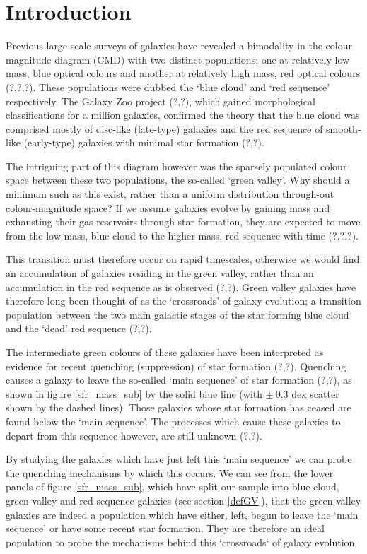 \documentclass{mn2e}
\begin{document}
\section{Introduction}
Previous large scale surveys of galaxies have revealed a bimodality in the colour-magnitude diagram (CMD) with two distinct populations; one at relatively low mass, blue optical colours and another at relatively high mass, red optical colours (?,?,?). These populations were dubbed the `blue cloud' and `red sequence' respectively. The Galaxy Zoo project (?,?), which gained morphological classifications for a million galaxies, confirmed the theory that the blue cloud was comprised mostly of disc-like (late-type) galaxies and the red sequence of smooth-like (early-type) galaxies with minimal star formation (?,?). 

The intriguing part of this diagram however was the sparsely populated colour space between these two populations, the so-called `green valley'. Why should a minimum such as this exist, rather than a uniform distribution through-out colour-magnitude space? If we assume galaxies evolve by gaining mass and exhausting their gas reservoirs through star formation, they are expected to move from the low mass, blue cloud to the higher mass, red sequence with time (?,?,?). 

This transition must therefore occur on rapid timescales, otherwise we would find an accumulation of galaxies residing in the green valley, rather than an accumulation in the red sequence as is observed (?,?). Green valley galaxies have therefore long been thought of as the `crossroads' of galaxy evolution; a transition population between the two main galactic stages of the star forming blue cloud and the `dead' red sequence (?,?).

The intermediate green colours of these galaxies have been interpreted as evidence for recent quenching (suppression) of star formation (?,?). Quenching causes a galaxy to leave the so-called `main sequence' of star formation (?,?), as shown in figure \ref{sfr_mass_sub} by the solid blue line (with $\pm ~0.3$ dex scatter shown by the dashed lines). Those galaxies whose star formation has ceased are found below the `main sequence'. The processes which cause these galaxies to depart from this sequence however, are still unknown (?,?).

By studying the galaxies which  have just left this `main sequence' we can probe the quenching mechanisms by which this occurs. We can see from the lower panels of figure \ref{sfr_mass_sub}, which have split our sample into blue cloud, green valley and red sequence galaxies (see section \ref{defGV}), that the green valley galaxies are indeed a population which have either, left, begun to leave the `main sequence' or have some recent star formation. They are therefore an ideal population to probe the mechanisms behind this `crossroads` of galaxy evolution.
\end{document}
